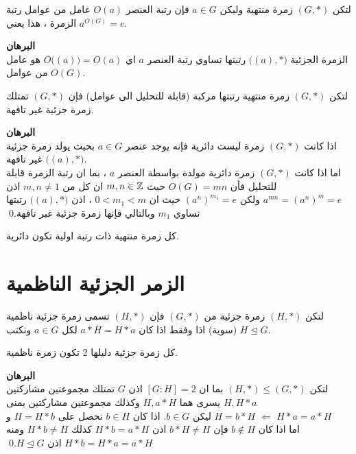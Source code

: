  \begin{corollary}
 	لتكن $(G, *) $ زمرة منتهية وليكن $a\in G$ فإن رتبة العنصر $O(a)$ عامل من عوامل رتبة الزمرة ، هذا يعني $a^{O(G)} =e$.
 \end{corollary}
 \noindent
 \textbf{البرهان}\\
 \noindent
 الزمرة الجزئية $\big((a), *\big)$ رتبتها تساوي رتبة العنصر $a$ اي
 $O\big((a)\big) = O(a)$
 هو عامل من عوامل $O(G)$.
 
 \begin{corollary}
 	لتكن $(G, *)$ زمرة منتهية رتبتها مركبة (قابلة للتحليل الى عوامل) فإن $(G, *)$ تمتلك زمرة جزئية غير تافهة.
 \end{corollary}
 \noindent
 \textbf{البرهان}\\
 \noindent
 اذا كانت $(G, *)$ زمرة ليست دائرية فإنه يوجد عنصر $a\in G$ بحيث يولد زمرة جزئية $\big((a),*\big)$ غير تافهة.\\
 اما اذا كانت $(G, *)$ زمرة دائرية مولدة بواسطة العنصر $a$ ، بما ان رتبة الزمرة قابلة للتحليل فأن $O(G)=mn$ حيث $m,n\in \mathbb{Z}$ ان كل من $m,n\neq 1 $ اذن $a^{mn} = (a^n)^m=e$ ولكن 
 $(a^n)^{m_1} = e$ حيث ان $ 0 < m_1 <m$
 ، اذن 
 $\big((a), *\big)$ رتبتها تساوي $m_1$ وبالتالي فإنها زمرة جزئية غير تافهة.\qed
 
 
 \begin{corollary}
 	كل زمرة منتهية ذات رتبة اولية تكون دائرية.
 \end{corollary}
 
 \section{الزمر الجزئية الناظمية}
 
 \begin{definition}
 	لتكن $(H, *)$ زمرة جزئية من $(G, *)$ فإن $(H, *)$ تسمى زمرة جزئية ناظمية (سوية) اذا وفقط اذا كان $a*H = H*a$ لكل $a\in G$ ونكتب $ H \trianglelefteq G$.
 \end{definition}
 
 \begin{example}
 	كل زمرة جزئية دليلها 2 تكون زمرة ناظمية.
 \end{example}
 \noindent
 \textbf{البرهان}\\
 \noindent
 لتكن $(H, *)\leq (G, *)$ بما ان $[G:H]=2$ اذن $G$ تمتلك مجموعتين مشاركتين يسرى هما $H, a*H$ وكذلك مجموعتين مشاركتين يمنى $H, H*a$ \\
 ليكن $b\in G$. اذا كان $b\in H$ نحصل على $H=H*b$ و $H=b*H$ $\Leftarrow$ $H*a=a*H$\\
 اما اذا كان $b\notin H$ فإن $b*H\neq H$ اذن $H*b = a*H$ كذلك $H*b \neq H$ ومنه $H*b = H*a=a*H$ اذن $H\trianglelefteq G$.\qed
 
